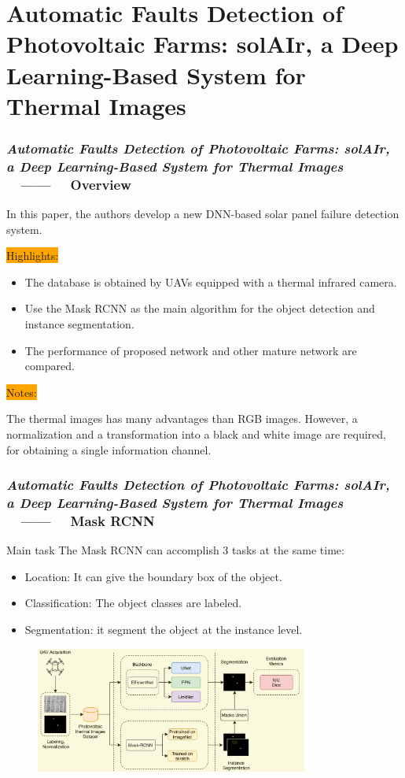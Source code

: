 \section{Automatic Faults Detection of Photovoltaic Farms: solAIr, 
a Deep Learning-Based System for Thermal Images}

\begin{frame}
    \frametitle{\textit{Automatic Faults Detection of Photovoltaic Farms: solAIr, 
a Deep Learning-Based System for Thermal Images}
    ~~------~~ Overview}

    In this paper, the authors develop a new DNN-based solar panel failure
    detection system.

    \colorbox{orange}{Highlights:}
    \begin{itemize}
        \item The database is obtained by UAVs equipped with a thermal infrared
            camera.
        \item Use the Mask RCNN as the main algorithm for the object detection
            and instance segmentation.
        \item The performance of proposed network and other mature network are
            compared.
    \end{itemize}

    \colorbox{orange}{Notes:} 

    The thermal images has many advantages than RGB images. However, 
    a normalization and a transformation into a black and white image
    are required, for obtaining a single information channel.


\end{frame}

\begin{frame}
    \frametitle{\textit{Automatic Faults Detection of Photovoltaic Farms: solAIr, 
a Deep Learning-Based System for Thermal Images}
    ~~------~~ Mask RCNN}
    \begin{block}{Main task}
        The Mask RCNN can accomplish 3 tasks at the same time:
    \end{block}
    \begin{itemize}
        \item Location: It can give the boundary box of the object.
        \item Classification: The object classes are labeled.
        \item Segmentation: it segment the object at the instance level.
    \end{itemize}
    \begin{figure}[H]
        \centering
        \includegraphics[width=0.8\textwidth]{./imgs/maask_rcnn}
    \end{figure}
\end{frame}
